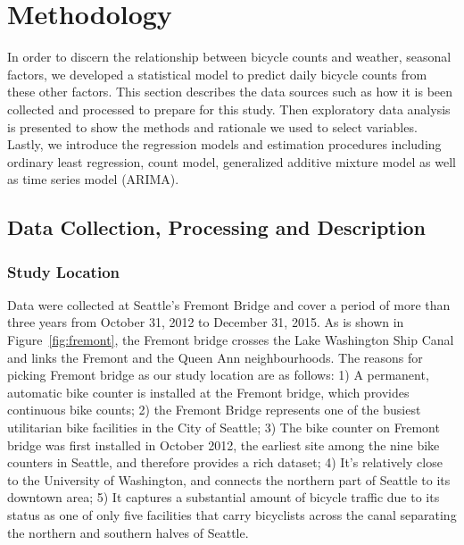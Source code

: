 \documentclass [11pt, proquest] {uwthesis}[2015/03/03]
\begin{document}
 
\chapter{Methodology}


In order to discern the relationship between bicycle counts and weather, seasonal factors, we developed a statistical model to predict daily bicycle counts from these other factors. This section describes the data sources such as how it is been collected and processed to prepare for this study. Then exploratory data analysis is presented to show the methods and rationale we used to select variables. Lastly, we introduce the regression models and estimation procedures including ordinary least regression, count model, generalized additive mixture model as well as time series model (ARIMA).

\section{Data Collection, Processing and Description}
\label{sec:data}

\subsection{Study Location}
Data were collected at Seattle's Fremont Bridge and cover a period of more than three years from October 31, 2012 to December 31, 2015. As is shown in Figure~\ref{fig:fremont}, the Fremont bridge crosses the Lake Washington Ship Canal and links the Fremont and the Queen Ann neighbourhoods. The reasons for picking Fremont bridge as our study location are as follows: 1) A permanent, automatic bike counter is installed at the Fremont bridge, which provides continuous bike counts; 2) the Fremont Bridge represents one of the busiest utilitarian bike facilities in the City of Seattle; 3) The bike counter on Fremont bridge was first installed in October 2012, the earliest site among the nine bike counters in Seattle, and therefore provides a rich dataset; 4) It's relatively close to the University of Washington, and connects the northern part of Seattle to its downtown area; 5) It captures a substantial amount of bicycle traffic due to its status as one of only five facilities that carry bicyclists across the canal separating the northern and southern halves of Seattle.
\end{document}
